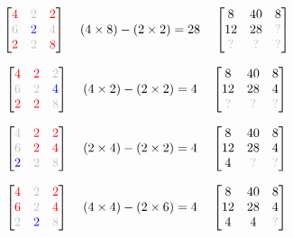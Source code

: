 \documentclass[11pt]{article}
\begin{document}
\begin{equation}\begin{bmatrix}\color{red}4 & \color{lightgray}2 & \color{red}2\\\color{lightgray}6 & \color{blue}2 & \color{lightgray}4\\\color{red}2 & \color{lightgray}2 & \color{red}8\end{bmatrix}\;\;\;\;(4\times8) - (2\times2) = 28\;\;\;\;\begin{bmatrix}8 & 40 & 8\\12 & 28 & \color{lightgray}?\\\color{lightgray}? & \color{lightgray}? & \color{lightgray}?\end{bmatrix} \end{equation}

\begin{equation}\begin{bmatrix}\color{red}4 & \color{red}2 & \color{lightgray}2\\\color{lightgray}6 & \color{lightgray}2 & \color{blue}4\\\color{red}2 & \color{red}2 & \color{lightgray}8\end{bmatrix}\;\;\;\;(4\times2) - (2\times2) = 4\;\;\;\;\begin{bmatrix}8 & 40 & 8\\12 & 28 & 4\\\color{lightgray}? & \color{lightgray}? & \color{lightgray}?\end{bmatrix} \end{equation}

\begin{equation}\begin{bmatrix}\color{lightgray}4 & \color{red}2 & \color{red}2\\\color{lightgray}6 & \color{red}2 & \color{red}4\\\color{blue}2 & \color{lightgray}2 & \color{lightgray}8\end{bmatrix}\;\;\;\;(2\times4) - (2\times2) = 4\;\;\;\;\begin{bmatrix}8 & 40 & 8\\12 & 28 & 4\\4 & \color{lightgray}? & \color{lightgray}?\end{bmatrix} \end{equation}

\begin{equation}\begin{bmatrix}\color{red}4 & \color{lightgray}2 & \color{red}2\\\color{red}6 & \color{lightgray}2 & \color{red}4\\\color{lightgray}2 & \color{blue}2 & \color{lightgray}8\end{bmatrix}\;\;\;\;(4\times4) - (2\times6) = 4\;\;\;\;\begin{bmatrix}8 & 40 & 8\\12 & 28 & 4\\4 & 4 & \color{lightgray}?\end{bmatrix} \end{equation}
\end{document}
